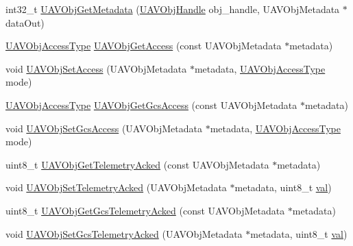 \begin{DoxyCompactItemize}
\item 
int32\-\_\-t \hyperlink{group___u_a_v_object_handling_gac4ddbaf9ae7938badae8552d4ef88b20}{\-U\-A\-V\-Obj\-Get\-Metadata} (\hyperlink{targets_2_u_a_v_objects_2inc_2uavobjectmanager_8h_a279053e22be53ce9f895043aaeb91e3b}{\-U\-A\-V\-Obj\-Handle} obj\-\_\-handle, \-U\-A\-V\-Obj\-Metadata $\ast$data\-Out)
\item 
\hyperlink{targets_2_u_a_v_objects_2inc_2uavobjectmanager_8h_a04b37fd239d7727a21668d35d11ad7df}{\-U\-A\-V\-Obj\-Access\-Type} \hyperlink{group___u_a_v_object_handling_gacfa1b9a76f44f743c6e44302670af480}{\-U\-A\-V\-Obj\-Get\-Access} (const \-U\-A\-V\-Obj\-Metadata $\ast$metadata)
\item 
void \hyperlink{group___u_a_v_object_handling_ga54607c2130bc133553b18ece1c4d1540}{\-U\-A\-V\-Obj\-Set\-Access} (\-U\-A\-V\-Obj\-Metadata $\ast$metadata, \hyperlink{targets_2_u_a_v_objects_2inc_2uavobjectmanager_8h_a04b37fd239d7727a21668d35d11ad7df}{\-U\-A\-V\-Obj\-Access\-Type} mode)
\item 
\hyperlink{targets_2_u_a_v_objects_2inc_2uavobjectmanager_8h_a04b37fd239d7727a21668d35d11ad7df}{\-U\-A\-V\-Obj\-Access\-Type} \hyperlink{group___u_a_v_object_handling_gad5fdcf98dae5cb90223f849df2bda08b}{\-U\-A\-V\-Obj\-Get\-Gcs\-Access} (const \-U\-A\-V\-Obj\-Metadata $\ast$metadata)
\item 
void \hyperlink{group___u_a_v_object_handling_ga1ac1d4a25c3ca9025ff3dec90fa6ee91}{\-U\-A\-V\-Obj\-Set\-Gcs\-Access} (\-U\-A\-V\-Obj\-Metadata $\ast$metadata, \hyperlink{targets_2_u_a_v_objects_2inc_2uavobjectmanager_8h_a04b37fd239d7727a21668d35d11ad7df}{\-U\-A\-V\-Obj\-Access\-Type} mode)
\item 
uint8\-\_\-t \hyperlink{group___u_a_v_object_handling_gaed561ee171e8da056b47750e8f7a9cb1}{\-U\-A\-V\-Obj\-Get\-Telemetry\-Acked} (const \-U\-A\-V\-Obj\-Metadata $\ast$metadata)
\item 
void \hyperlink{group___u_a_v_object_handling_ga43e002d9dd75b34a4392308763d6bb35}{\-U\-A\-V\-Obj\-Set\-Telemetry\-Acked} (\-U\-A\-V\-Obj\-Metadata $\ast$metadata, uint8\-\_\-t \hyperlink{group___p_i_o_s___t_i_m_ga757344f09097232d715d55cbf9d61a43}{val})
\item 
uint8\-\_\-t \hyperlink{group___u_a_v_object_handling_gaf7923732ed9e6eb1e367180cb339ca3d}{\-U\-A\-V\-Obj\-Get\-Gcs\-Telemetry\-Acked} (const \-U\-A\-V\-Obj\-Metadata $\ast$metadata)
\item 
void \hyperlink{group___u_a_v_object_handling_ga2a530de3ecfe1d8010eeb98f6e4eb037}{\-U\-A\-V\-Obj\-Set\-Gcs\-Telemetry\-Acked} (\-U\-A\-V\-Obj\-Metadata $\ast$metadata, uint8\-\_\-t \hyperlink{group___p_i_o_s___t_i_m_ga757344f09097232d715d55cbf9d61a43}{val})

\end{DoxyCompactItemize}
